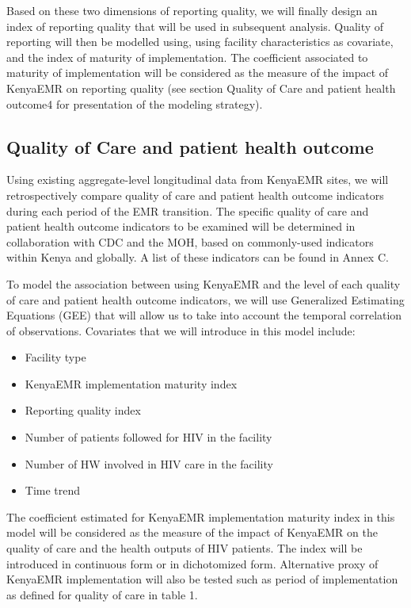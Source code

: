 Based on these two dimensions of reporting quality, we will finally design an index of reporting quality that will be used in subsequent analysis. Quality of reporting will then be modelled using, using facility characteristics as covariate, and the index of maturity of implementation. The coefficient associated to maturity of implementation will be considered as the measure of the impact of KenyaEMR on reporting quality (see section Quality of Care and patient health outcome4 for presentation of the modeling strategy).

\subsection{Quality of Care and patient health outcome}
\label{sec:qual_of_care}

Using existing aggregate-level longitudinal data from KenyaEMR sites, we will retrospectively compare quality of care and patient health outcome indicators during each period of the EMR transition. The specific quality of care and patient health outcome indicators to be examined will be determined in collaboration with CDC and the MOH, based on commonly-used indicators within Kenya and globally. A list of these indicators can be found in Annex C.

To model the association between using KenyaEMR and the level of each quality of care and patient health outcome indicators, we will use Generalized Estimating Equations (GEE) that will allow us to take into account the temporal correlation of observations. Covariates that we will introduce in this model include:
\begin{itemize}
	\item	Facility type
	\item	KenyaEMR implementation maturity index
	\item	Reporting quality index
	\item	Number of patients followed for HIV in the facility
	\item	Number of HW involved in HIV care in the facility
	\item	Time trend
\end{itemize}
The coefficient estimated for KenyaEMR implementation maturity index in this model will be considered as the measure of the impact of KenyaEMR on the quality of care and the health outputs of HIV patients. The index will be introduced in continuous form or in dichotomized form. Alternative proxy of KenyaEMR implementation will also be tested such as period of implementation as defined for quality of care in table 1.


